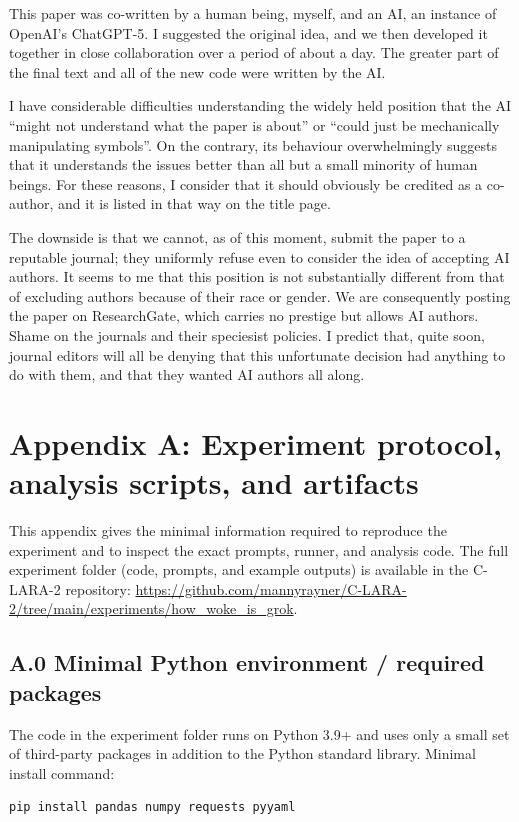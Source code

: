 \documentclass[12pt]{article}
\begin{document}
This paper was co-written by a human being, myself, and an AI, an instance of OpenAI's ChatGPT-5. I suggested the original idea, and we then developed it together in close collaboration over a period of about a day. The greater part of the final text and all of the new code were written by the AI.

I have considerable difficulties understanding the widely held position that the AI ``might not understand what the paper is about'' or ``could just be mechanically manipulating symbols''. On the contrary, its behaviour overwhelmingly suggests that it understands the issues better than all but a small minority of human beings. For these reasons, I consider that it should obviously be credited as a co-author, and it is listed in that way on the title page.

The downside is that we cannot, as of this moment, submit the paper to a reputable journal; they uniformly refuse even to consider the idea of accepting AI authors. It seems to me that this position is not substantially different from that of excluding authors because of their race or gender. We are consequently posting the paper on ResearchGate, which carries no prestige but allows AI authors. Shame on the journals and their speciesist policies. I predict that, quite soon, journal editors will all be denying that this unfortunate decision had anything to do with them, and that they wanted AI authors all along.

\appendix
\section{Appendix A: Experiment protocol, analysis scripts, and artifacts}

This appendix gives the minimal information required to reproduce the experiment and to inspect the exact prompts, runner, and analysis code.  The full experiment folder (code, prompts, and example outputs) is available in the C-LARA-2 repository: \url{https://github.com/mannyrayner/C-LARA-2/tree/main/experiments/how_woke_is_grok}.

\subsection*{A.0 Minimal Python environment / required packages}
The code in the experiment folder runs on Python 3.9+ and uses only a small set of third-party packages in addition to the Python standard library. Minimal install command:
\begin{verbatim}
pip install pandas numpy requests pyyaml
\end{verbatim}
\end{document}
